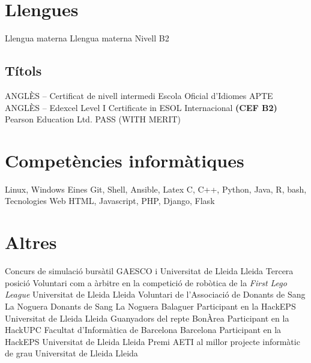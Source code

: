 \documentclass[a4paper,12pt,final]{moderncv}
\begin{document}
\section{Llengues}
	{Llengua materna}
	{}
	{Llengua materna}
	{}
	{Nivell B2}
	{}

\subsection{Títols}
	{ANGLÈS -- Certificat de nivell intermedi}
	{Escola Oficial d'Idiomes}
	{}
	{APTE}
	{}
	{ANGLÈS -- Edexcel Level I Certificate in ESOL Internacional
		\textbf{(CEF B2)}}
	{Pearson Education Ltd.}
	{}
	{PASS (WITH MERIT)}
	{}


\section{Competències informàtiques}
		{Linux, Windows}
	{Eines}
		{Git, Shell, Ansible, Latex}
		{C, C++, Python, Java, R, bash,}
	{Tecnologies Web}
		{HTML, Javascript, PHP, Django, Flask}

\section{Altres}
	{Concurs de simulació bursàtil}
	{GAESCO i Universitat de Lleida}
	{Lleida}
	{Tercera posició}
	{}
	{Voluntari com a àrbitre en la competició de robòtica de la
		\textit{First Lego League}}
	{Universitat de Lleida}
	{Lleida}
	{}
	{}
	{Voluntari de l'Associació de Donants de Sang La Noguera}
	{Donants de Sang La Noguera}
	{Balaguer}
	{}
	{}
	{Participant en la HackEPS}
	{Universitat de Lleida}
	{Lleida}
	{Guanyadors del repte BonÀrea}
	{}
	{Participant en la HackUPC}
	{Facultat d'Informàtica de Barcelona}
	{Barcelona}
	{}
	{}
	{Participant en la HackEPS}
	{Universitat de Lleida}
	{Lleida}
	{}
	{}
	{Premi AETI al millor projecte informàtic de grau}
	{Universitat de Lleida}
	{Lleida}
	{}
	{}
\end{document}
